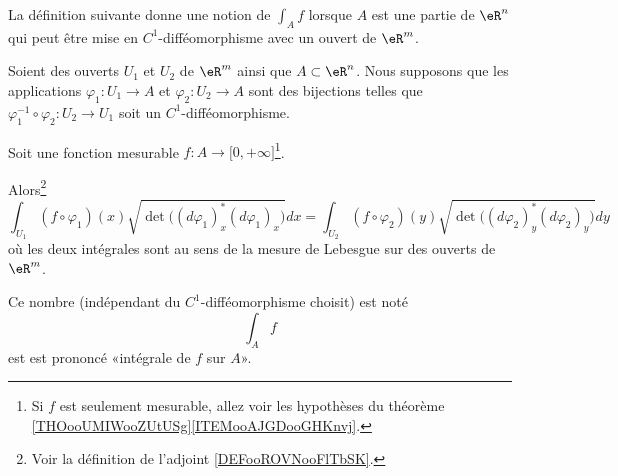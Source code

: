 La définition suivante donne une notion de \( \int_Af\) lorsque \( A\) est une partie de \( \eR^n\) qui peut être mise en \( C^1\)-difféomorphisme avec un ouvert de \( \eR^m\).
\begin{propositionDef}     \label{PROPooOAHWooAfxvyv}
    Soient des ouverts \( U_1\) et \( U_2\) de \( \eR^m\) ainsi que \( A\subset \eR^n\). Nous supposons que les applications \( \varphi_1\colon U_1\to A\) et \( \varphi_2\colon U_2\to A\) sont des bijections telles que \( \varphi_1^{-1}\circ \varphi_2\colon U_2\to U_1\) soit un \( C^1\)-difféomorphisme. 
        
    Soit une fonction mesurable \( f\colon A\to \mathopen[ 0 , +\infty \mathclose]\)\footnote{Si \( f\) est seulement mesurable, allez voir les hypothèses du théorème \ref{THOooUMIWooZUtUSg}\ref{ITEMooAJGDooGHKnvj}.}.

    Alors\footnote{Voir la définition de l'adjoint \ref{DEFooROVNooFlTbSK}.}
    \begin{equation}
        \int_{U_1}(f\circ \varphi_1)(x)\sqrt{ \det\big( (d\varphi_1)_x^*(d\varphi_1)_x \big) }dx=
        \int_{U_2}(f\circ \varphi_2)(y)\sqrt{ \det\big( (d\varphi_2)_y^*(d\varphi_2)_y \big) }dy
    \end{equation}
    où les deux intégrales sont au sens de la mesure de Lebesgue sur des ouverts de \( \eR^m\).

    Ce nombre (indépendant du \( C^1\)-difféomorphisme choisit) est noté
    \begin{equation}
        \int_Af
    \end{equation}
    est est prononcé «intégrale de \( f\) sur \( A\)».
\end{propositionDef}

